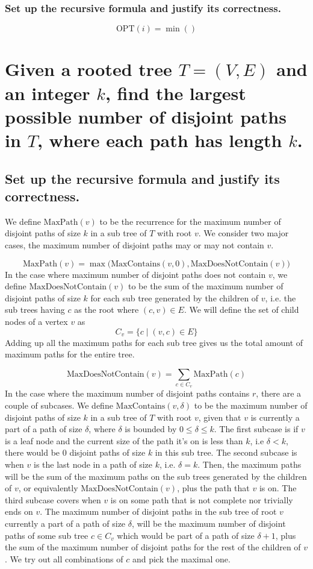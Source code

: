 \documentclass[11pt]{scrartcl}
\newcommand{\opt}{\text{OPT}}
\newcommand{\maxp}{\text{MaxPath}}
\newcommand{\ctn}{\text{MaxContains}}
\newcommand{\dctn}{\text{MaxDoesNotContain}}
\begin{document}
\subsubsection{
	Set up the recursive formula and justify its correctness.
}

$$
\opt(i) = \min()
$$






\section{
	Given a	rooted tree $T = (V, E)$ and an integer $k$, find the largest possible 
	number of disjoint paths in $T$, where each path has length $k$.
 }
\subsection{
	Set up the recursive formula and justify its correctness.
}
We define $\maxp(v)$ to be the recurrence for the maximum number of disjoint paths of size $k$ in a sub tree
of $T$ with root $v$. We consider two major cases, the maximum number of disjoint paths may or 
may not contain $v$. 

$$
\maxp(v) = \max \Big(\ctn(v, 0) , \dctn(v) \Big)
$$
In the case where maximum number of disjoint paths does not contain $v$, we define 
$\dctn(v)$ to be the sum of   
the maximum number of disjoint paths of size $k$ for each sub tree generated by the children of $v$, 
i.e. the sub trees having $c$ as the root where $(c,v) \in E$.
We will define the set of child nodes of a vertex $v$ as $$C_v = \Big\{c \mid (v,c) \in E\Big\}$$
Adding up all the maximum paths for each sub tree
gives us the total amount of maximum paths for the entire tree. 

$$
\dctn(v) = \sum_{c \in C_v } \maxp(c)
$$
In the case where the maximum number of disjoint paths contains $r$, there are a couple of subcases.
We define $\ctn(v,\delta)$ to be the maximum number of disjoint paths of size $k$
in a sub tree of $T$ with root $v$, given that 
$v$ is currently a part of a path of size $\delta$, where $\delta$ is bounded by $0 \leq \delta \leq k$.
The first subcase is if $v$ is a leaf node and the current size of the path it's on is less than $k$, 
i.e $\delta < k$, there would be $0$ disjoint paths of size $k$ in this sub tree. 
The second subcase is when $v$ is the last node in a path of size $k$, i.e. $\delta = k$. Then, the 
maximum paths will be the sum of the maximum paths on the sub trees generated by the children of 
$v$, or equivalently $\dctn(v)$, plus the path that $v$ is on.  
The third subcase covers when $v$ is on some path that is not complete nor trivially ends on $v$.
The maximum number of disjoint paths in the sub tree of root $v$ currently a part of a path of size $\delta$,
will be the maximum number of disjoint paths of some sub tree $c \in C_v$ which would be 
part of a path of size $\delta + 1$, plus the sum of the maximum number of disjoint paths for 
the rest of the children of $v$. We try out all combinations of $c$ and pick the maximal one.
\end{document}
